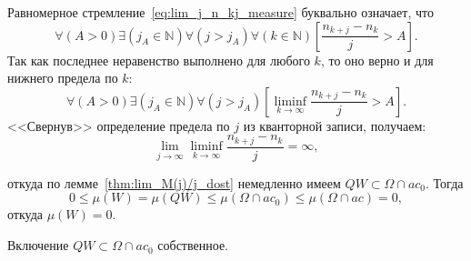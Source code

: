 
Равномерное стремление~\eqref{eq:lim_j_n_kj_measure}
буквально означает, что
\begin{equation}
	\forall(A>0)\exists(j_A\in\mathbb{N})\forall(j > j_A)\forall(k\in\mathbb{N})
	\left[
		\frac{n_{k+j}-n_k}{j}>A
	\right]
	.
\end{equation}
Так как последнее неравенство выполнено для любого $k$,
то оно верно и для нижнего предела по $k$:
\begin{equation}
	\forall(A>0)\exists(j_A\in\mathbb{N})\forall(j > j_A)
	\left[
		\liminf_{k\to\infty}\frac{n_{k+j}-n_k}{j}>A
	\right]
	.
\end{equation}
<<Свернув>> определение предела по $j$ из кванторной записи, получаем:
\begin{equation}
	\lim_{j\to\infty}\liminf_{k\to\infty}\frac{n_{k+j}-n_k}{j} = \infty
	,
\end{equation}


откуда по лемме~\ref{thm:lim_M(j)/j_dost} немедленно имеем $QW \subset \Omega\cap ac_0$.
Тогда
\begin{equation}
	0 \leq \mu(W) = \mu(QW) \leq \mu(\Omega\cap ac_0) \leq \mu(\Omega\cap ac) = 0
	,
\end{equation}
откуда $\mu(W)=0$.

\begin{hypothesis}
	Включение $QW\subset \Omega\cap ac_0$ собственное.
\end{hypothesis}
